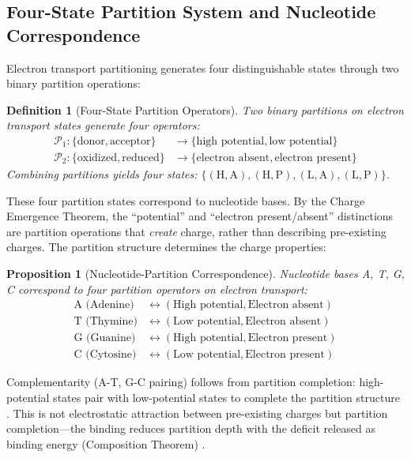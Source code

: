 \documentclass[11pt,a4paper]{article}
\newtheorem{definition}[theorem]{Definition}
\newtheorem{proposition}[theorem]{Proposition}
\theoremstyle{remark}
\begin{document}
\subsection{Four-State Partition System and Nucleotide Correspondence}

Electron transport partitioning generates four distinguishable states through two binary partition operations:

\begin{definition}[Four-State Partition Operators]
\label{def:four_state}
Two binary partitions on electron transport states generate four operators:
\begin{align}
\mathcal{P}_1: \{\text{donor}, \text{acceptor}\} &\to \{\text{high potential}, \text{low potential}\} \\
\mathcal{P}_2: \{\text{oxidized}, \text{reduced}\} &\to \{\text{electron absent}, \text{electron present}\}
\end{align}
Combining partitions yields four states: $\{(\text{H},\text{A}), (\text{H},\text{P}), (\text{L},\text{A}), (\text{L},\text{P})\}$.
\end{definition}

These four partition states correspond to nucleotide bases. By the Charge Emergence Theorem, the ``potential'' and ``electron present/absent'' distinctions are partition operations that \emph{create} charge, rather than describing pre-existing charges. The partition structure determines the charge properties:

\begin{proposition}[Nucleotide-Partition Correspondence]
\label{prop:nucleotide_partition}
Nucleotide bases A, T, G, C correspond to four partition operators on electron transport:
\begin{align}
\text{A (Adenine)} &\leftrightarrow (\text{High potential}, \text{Electron absent}) \\
\text{T (Thymine)} &\leftrightarrow (\text{Low potential}, \text{Electron absent}) \\
\text{G (Guanine)} &\leftrightarrow (\text{High potential}, \text{Electron present}) \\
\text{C (Cytosine)} &\leftrightarrow (\text{Low potential}, \text{Electron present})
\end{align}
\end{proposition}

Complementarity (A-T, G-C pairing) follows from partition completion: high-potential states pair with low-potential states to complete the partition structure \citep{watson1953molecular, travers2015dna}. This is not electrostatic attraction between pre-existing charges but partition completion---the binding reduces partition depth with the deficit released as binding energy (Composition Theorem) \citep{Sachikonye2025_Partition}.
\end{document}
